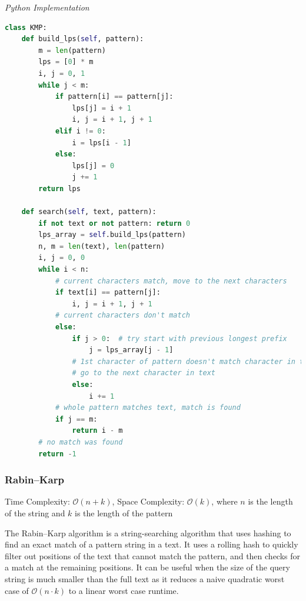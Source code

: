 \documentclass{article}
\newcommand{\bigO}{\mathcal{O}}
\begin{document}
\vspace{8pt} \emph{Python Implementation}
\begin{lstlisting}[language=Python]    
class KMP:
    def build_lps(self, pattern):
        m = len(pattern)
        lps = [0] * m
        i, j = 0, 1
        while j < m: 
            if pattern[i] == pattern[j]: 
                lps[j] = i + 1
                i, j = i + 1, j + 1
            elif i != 0:
                i = lps[i - 1]
            else:
                lps[j] = 0
                j += 1
        return lps
        
    def search(self, text, pattern):
        if not text or not pattern: return 0
        lps_array = self.build_lps(pattern)
        n, m = len(text), len(pattern)
        i, j = 0, 0
        while i < n:
            # current characters match, move to the next characters
            if text[i] == pattern[j]:
                i, j = i + 1, j + 1
            # current characters don't match
            else:
                if j > 0:  # try start with previous longest prefix
                    j = lps_array[j - 1]
                # 1st character of pattern doesn't match character in text
                # go to the next character in text
                else:
                    i += 1
            # whole pattern matches text, match is found
            if j == m:
                return i - m
        # no match was found
        return -1
\end{lstlisting}
    
    \subsubsection{Rabin–Karp}
    Time Complexity: $\bigO(n + k)$, Space Complexity: $\bigO(k)$, where $n$ is the length of the string and $k$ is the length of the pattern
    
    
    The Rabin–Karp algorithm is a string-searching algorithm that uses hashing to find an exact match of a pattern string in a text. It uses a rolling hash to quickly filter out positions of the text that cannot match the pattern, and then checks for a match at the remaining positions. It can be useful when the size of the query string is much smaller than the full text as it reduces a naive quadratic worst case of $\bigO(n\cdot k)$ to a linear worst case runtime.
\end{document}

